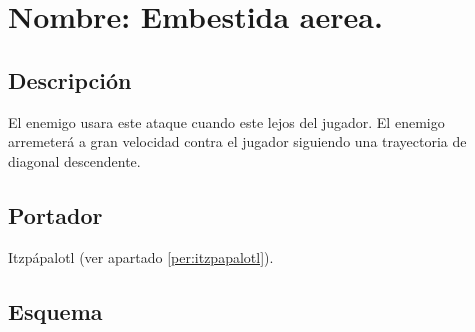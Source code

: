 \section{Nombre: Embestida aerea.}\label{hab.EmbesAer}
\subsection{Descripción}
El enemigo usara este ataque cuando este lejos del jugador. El enemigo arremeterá a gran velocidad contra el jugador siguiendo una trayectoria de diagonal descendente.
\subsection{Portador}
Itzpápalotl (ver apartado \ref{per:itzpapalotl}).
\subsection{Esquema}
			